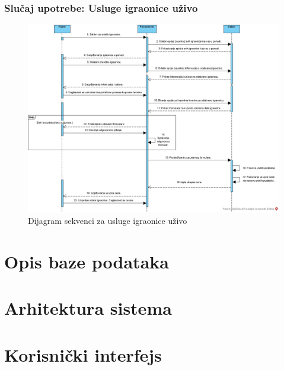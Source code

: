 \documentclass[a4paper]{article}
\begin{document}
\subsubsection{Slučaj upotrebe: Usluge igraonice uživo}

\begin{figure}[!ht]
\begin{center}
\includegraphics[scale=0.37]{sections/images/dijagram_sekvenci_usluge_igraonice_uzivo.jpg}
\end{center}
\caption{Dijagram sekvenci za usluge igraonice uživo}
\label{fig:kontekst}
\end{figure}

\newpage
\newpage
\newpage
\section{Opis baze podataka}


\newpage
\section{Arhitektura sistema}


\newpage
\section{Korisnički interfejs}

\end{document}

